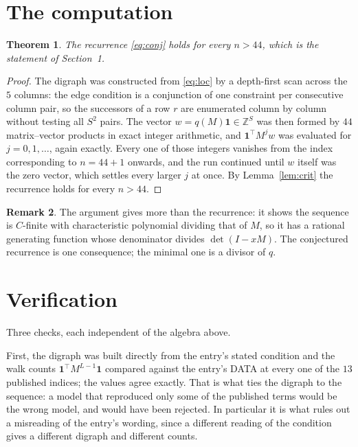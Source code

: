 \documentclass[11pt,a4paper]{article}
\theoremstyle{plain}
\newtheorem{theorem}{Theorem}
\theoremstyle{definition}
\newtheorem{remark}[theorem]{Remark}
\begin{document}
\section{The computation}

\begin{theorem}
The recurrence \eqref{eq:conj} holds for every $n>44$, which is the statement of
Section~1.
\end{theorem}

\begin{proof}
The digraph was constructed from \eqref{eq:loc} by a depth-first scan across the $5$
columns: the edge condition is a conjunction of one constraint per consecutive column
pair, so the successors of a row $r$ are enumerated column by column without testing all
$S^2$ pairs. The vector $w=q(M)\mathbf{1}\in\mathbb{Z}^{S}$ was then formed by $44$
matrix--vector products in exact integer arithmetic, and $\mathbf{1}^{\!\top}M^{j}w$ was
evaluated for $j=0,1,\dots$, again exactly. Every one of those integers vanishes from the
index corresponding to $n=44+1$ onwards, and the run continued until $w$ itself was the
zero vector, which settles every larger $j$ at once. By Lemma~\ref{lem:crit} the recurrence
holds for every $n>44$.
\end{proof}

\begin{remark}
The argument gives more than the recurrence: it shows the sequence is $C$-finite with
characteristic polynomial dividing that of $M$, so it has a rational generating function
whose denominator divides $\det(I-xM)$. The conjectured recurrence is one consequence; the
minimal one is a divisor of $q$.
\end{remark}

\section{Verification}

Three checks, each independent of the algebra above.

First, the digraph was built directly from the entry's stated condition and the walk counts
$\mathbf{1}^{\!\top}M^{L-1}\mathbf{1}$ compared against the entry's DATA at
every one of the $13$ published indices; the values agree exactly. That is what ties
the digraph to the sequence: a model that reproduced only some of the published terms would
be the wrong model, and would have been rejected. In particular it is what rules out a
misreading of the entry's wording, since a different reading of the condition gives a
different digraph and different counts.
\end{document}
